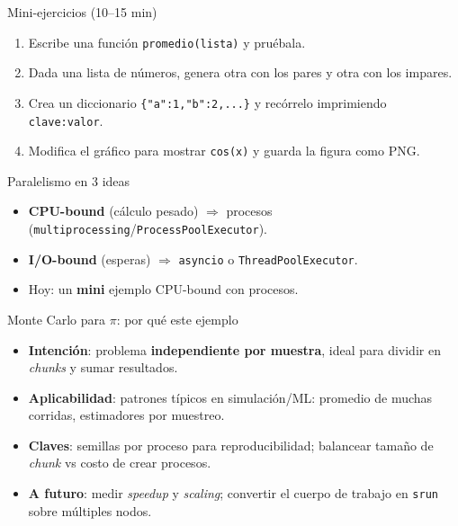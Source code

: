 \documentclass[aspectratio=169,professionalfonts]{beamer}
\begin{document}
\begin{frame}{Mini-ejercicios (10–15 min)}
\begin{enumerate}
  \item Escribe una función \texttt{promedio(lista)} y pruébala.
  \item Dada una lista de números, genera otra con los pares y otra con los impares.
  \item Crea un diccionario \texttt{\{"a":1,"b":2,...\}} y recórrelo imprimiendo \texttt{clave:valor}.
  \item Modifica el gráfico para mostrar \texttt{cos(x)} y guarda la figura como PNG.
\end{enumerate}
\end{frame}

\begin{frame}{Paralelismo en 3 ideas}
\begin{itemize}
  \item \textbf{CPU-bound} (cálculo pesado) \(\Rightarrow\) procesos (\texttt{multiprocessing}/\texttt{ProcessPoolExecutor}).
  \item \textbf{I/O-bound} (esperas) \(\Rightarrow\) \texttt{asyncio} o \texttt{ThreadPoolExecutor}.
  \item Hoy: un \textbf{mini} ejemplo CPU-bound con procesos.
\end{itemize}
\end{frame}

\begin{frame}{Monte Carlo para \(\pi\): por qué este ejemplo}
\begin{itemize}
  \item \textbf{Intención}: problema \textbf{independiente por muestra}, ideal para dividir en \emph{chunks} y sumar resultados.
  \item \textbf{Aplicabilidad}: patrones típicos en simulación/ML: promedio de muchas corridas, estimadores por muestreo.
  \item \textbf{Claves}: semillas por proceso para reproducibilidad; balancear tamaño de \emph{chunk} vs costo de crear procesos.
  \item \textbf{A futuro}: medir \textit{speedup} y \textit{scaling}; convertir el cuerpo de trabajo en \texttt{srun} sobre múltiples nodos.
\end{itemize}
\end{frame}
\end{document}
